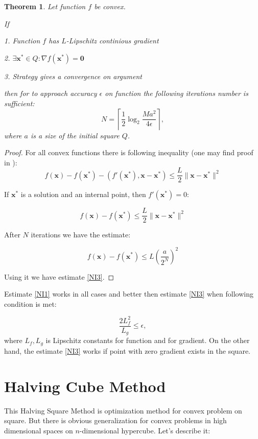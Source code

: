 \documentclass[12pt]{article}
\newtheorem{theorem}{Theorem}[section]
\begin{document}
\begin{theorem}
Let function $f$ be convex.

If

1. Function $f$ has $L$-Lipschitz continious gradient

2. $\exists \textbf{x}^*\in Q: \nabla f(\textbf{x}^*) = \textbf{0}$

3. Strategy gives a convergence on argument

then for to approach accuracy $\epsilon$ on function the following iterations number is sufficient:
\begin{equation}\label{NI3}N = \left\lceil\frac{1}{2}\log_2\frac{Ma^2}{4\epsilon}\right\rceil,
\end{equation}
where $a$ is a size of the initial square $Q$.
\end{theorem}

\begin{proof}
For all convex functions there is following inequality (one may find proof in \cite{Nesterov}):
$$f(\textbf{x}) - f(\textbf{x}^*) - (f'(\textbf{x}^*), \textbf{x} - \textbf{x}^*) \leq \frac{L}{2}\|\textbf{x}-\textbf{x}^*\|^2$$

If $\textbf{x}^*$ is a solution and an internal point, then $f'(\textbf{x}^*) = 0$:

$$f(\textbf{x}) - f(\textbf{x}^*)\leq \frac{L}{2}\|\textbf{x}-\textbf{x}^*\|^2$$

After $N$ iterations we have the estimate:

$$f(\textbf{x}) - f(\textbf{x}^*)\leq L\left(\frac{a}{2^N}\right)^2$$

Using it we have estimate \eqref{NI3}.
\end{proof}

Estimate \ref{NI1} works in all cases and better then estimate \ref{NI3} when following condition is met:

$$\frac{2L_f^2}{L_g}\leq \epsilon,$$
where $L_f, L_g$ is Lipschitz constants for function and for gradient. On the other hand, the estimate \ref{NI3} works if point with zero gradient exists in the square. 


\section{Halving Cube Method}

This Halving Square Method is optimization method for convex problem on square. But there is obvious generalization for convex problems in high dimensional spaces on $n$-dimensional hypercube.  Let's describe it:
\end{document}
